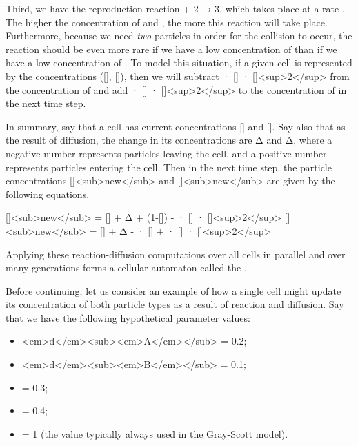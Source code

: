 {{Third, we have the reproduction reaction  + 2 → 3, which takes place at a rate . The higher the concentration of  and , the more this reaction will take place. Furthermore, because we need \textit{two}  particles in order for the collision to occur, the reaction should be even more rare if we have a low concentration of  than if we have a low concentration of . To model this situation, if a given cell is represented by the concentrations ([], []), then we will subtract  · [] · []<sup>2</sup> from the concentration of  and add  · [] · []<sup>2</sup> to the concentration of  in the next time step.

In summary, say that a cell has current concentrations [] and []. Say also that as the result of diffusion, the change in its concentrations are Δ and Δ, where a negative number represents particles leaving the cell, and a positive number represents particles entering the cell. Then in the next time step, the particle concentrations []<sub>new</sub> and []<sub>new</sub> are given by the following equations.

[]<sub>new</sub> = [] + Δ +  (1-[]) -  · [] · []<sup>2</sup>
[]<sub>new</sub> = [] + Δ -  · [] +  · [] · []<sup>2</sup>

Applying these reaction-diffusion computations over all cells in parallel and over many generations forms a cellular automaton called the .

Before continuing, let us consider an example of how a single cell might update its concentration of both particle types as a result of reaction and diffusion.  Say that we have the following hypothetical parameter values:

\begin{itemize}
\item <em>d</em><sub><em>A</em></sub> = 0.2;
\item <em>d</em><sub><em>B</em></sub> = 0.1;
\item {} = 0.3;
\item {} = 0.4;
\item {} = 1 (the value typically always used in the Gray-Scott model).
\end{itemize}

}}

